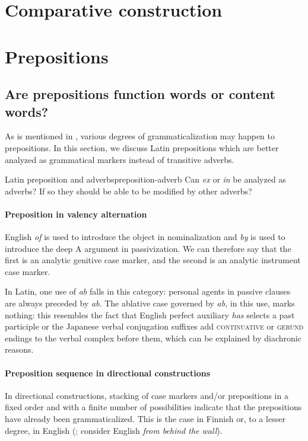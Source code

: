 \documentclass[a4paper, oneside, 12pt]{report}
\newcommand{\form}[1]{\emph{#1}}
\newcommand*{\category}[1]{\textsc{#1}}
\begin{document}
\section{Comparative construction}

\section{Prepositions}

\subsection{Are prepositions function words or content words?}\label{sec:modify.prep.grammar}

As is mentioned in ,
various degrees of grammaticalization may happen to prepositions.
In this section,
we discuss Latin prepositions which are better analyzed as
grammatical markers instead of transitive adverbs.

\begin{todobox}{Latin preposition and adverbs}{preposition-adverb}
    Can \form{ex} or \form{in} be analyzed as adverbs?
    If so they should be able to be modified by other adverbs?
\end{todobox}

\paragraph*{Preposition in valency alternation}
English \form{of} is used to introduce the object in nominalization 
and \form{by} is used to introduce the deep A argument in passivization.
We can therefore say that the first is an analytic genitive case marker,
and the second is an analytic instrument case marker.

In Latin, one use of \form{ab} falls in this category:
personal agents in passive clauses are always 
preceded by \form{ab}.
The ablative case governed by \form{ab}, in this use, marks nothing:
this resembles the fact that English perfect auxiliary \form{has} selects a past participle 
or the Japanese verbal conjugation suffixes add \category{continuative} or \category{gerund} endings to the verbal complex before them,
which can be explained by diachronic reasons.

\paragraph*{Preposition sequence in directional constructions}
In directional constructions,
stacking of case markers and/or prepositions in a fixed order 
and with a finite number of possibilities
indicate that the prepositions have already been grammaticalized.
This is the case in Finnish or, to a lesser degree, in English 
(\citealt{spatialpp}; consider English \form{from behind the wall}).
\end{document}
